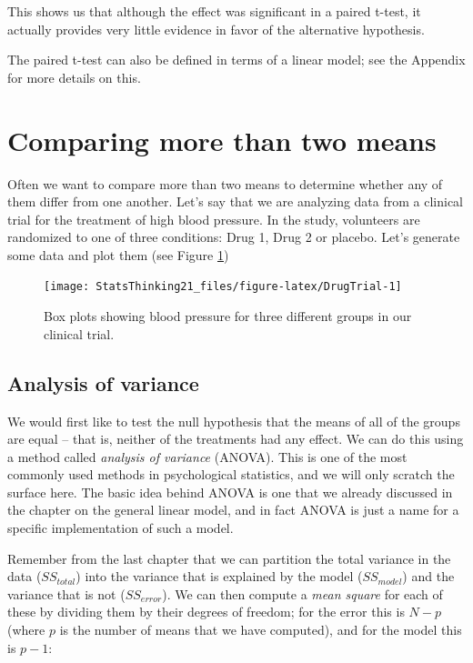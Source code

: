 \documentclass[12pt,]{book}
\theoremstyle{definition}
\theoremstyle{definition}
\theoremstyle{definition}
\theoremstyle{remark}
\begin{document}
This shows us that although the effect was significant in a paired t-test, it actually provides very little evidence in favor of the alternative hypothesis.

The paired t-test can also be defined in terms of a linear model; see the Appendix for more details on this.

\hypertarget{comparing-more-than-two-means}{%
\section{Comparing more than two means}\label{comparing-more-than-two-means}}

Often we want to compare more than two means to determine whether any of them differ from one another. Let's say that we are analyzing data from a clinical trial for the treatment of high blood pressure. In the study, volunteers are randomized to one of three conditions: Drug 1, Drug 2 or placebo. Let's generate some data and plot them (see Figure \ref{fig:DrugTrial})

\begin{figure}
\texttt{[image: StatsThinking21\_files/figure-latex/DrugTrial-1]} \caption{Box plots showing blood pressure for three different groups in our clinical trial.}\label{fig:DrugTrial}
\end{figure}

\hypertarget{ANOVA}{%
\subsection{Analysis of variance}\label{ANOVA}}

We would first like to test the null hypothesis that the means of all of the groups are equal -- that is, neither of the treatments had any effect. We can do this using a method called \emph{analysis of variance} (ANOVA). This is one of the most commonly used methods in psychological statistics, and we will only scratch the surface here. The basic idea behind ANOVA is one that we already discussed in the chapter on the general linear model, and in fact ANOVA is just a name for a specific implementation of such a model.

Remember from the last chapter that we can partition the total variance in the data (\(SS_{total}\)) into the variance that is explained by the model (\(SS_{model}\)) and the variance that is not (\(SS_{error}\)). We can then compute a \emph{mean square} for each of these by dividing them by their degrees of freedom; for the error this is \(N - p\) (where \(p\) is the number of means that we have computed), and for the model this is \(p - 1\):
\end{document}
